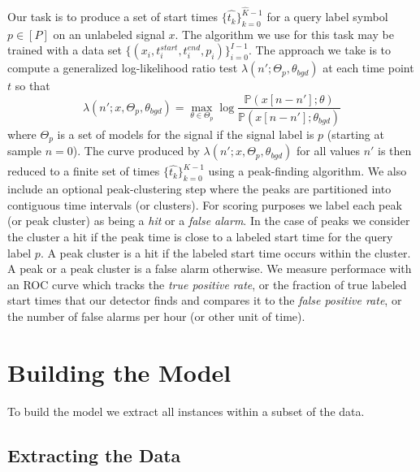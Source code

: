 \documentclass{article}
\begin{document}
Our task is to produce a set of start times $\{\hat{t_k}\}_{k=0}^{\hat{K}-1}$ for a query label symbol $p\in[P]$ on an unlabeled
signal $x$.  The algorithm we use for this task may be trained with a data set $\{(x_i,t_i^{start},t_i^{end},p_i)\}_{i=0}^{I-1}$.  The 
approach we take is to compute a generalized log-likelihood ratio test $\lambda(n';\Theta_p,\theta_{bgd})$ at each time point
$t$ so that
\begin{equation}
  \lambda(n';x,\Theta_p,\theta_{bgd}) = \max_{\theta\in\Theta_p}\log\frac{\mathbb{P}(x[n-n'];\theta)}{\mathbb{P}(x[n-n'];\theta_{bgd})}
\end{equation}
where $\Theta_p$ is a set of models for the signal if the signal label is $p$ (starting at sample $n=0$).
The curve produced by $\lambda(n'; x,\Theta_p,\theta_{bgd})$ for all values $n'$ is then reduced to a finite set of times $\{\hat{t_k}\}_{k=0}^{\hat{K}-1}$ using a peak-finding algorithm.  We also include an optional peak-clustering step where the peaks are partitioned
into contiguous time intervals (or clusters).  For scoring purposes we label each peak (or peak cluster) as being a \textit{hit}
or a \textit{false alarm}.  In the case of peaks we consider the cluster a hit if the peak time is close to a labeled start time
for the query label $p$. A peak cluster is a hit if the labeled start time occurs within the cluster.  A peak or a peak cluster
is a false alarm otherwise.  We measure performace with an ROC curve which tracks the \textit{true positive rate}, or the fraction of
true labeled start times that our detector finds and compares it to the \textit{false positive rate}, or the number of false alarms
per hour (or other unit of time).

\section{Building the Model}

To build the model we extract all instances within a subset of the data.

\subsection{Extracting the Data}
\end{document}
